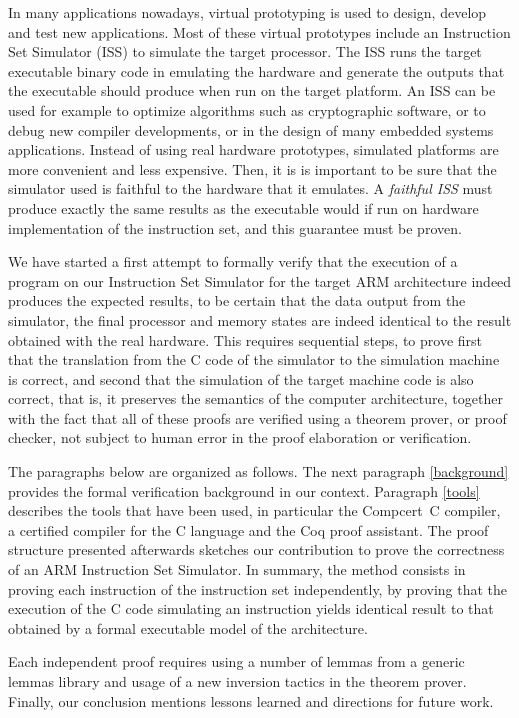 \documentclass{llncs}
\begin{document}
In many applications nowadays, virtual prototyping is used to design,
develop and test new applications. Most of these virtual prototypes
include an Instruction Set Simulator (ISS) to simulate the target
processor. The ISS runs the target executable binary code in emulating
the hardware and generate the outputs that the executable should
produce when run on the target platform. An ISS can be used for
example to optimize algorithms such as cryptographic software, or to
debug new compiler developments, or in the design of many embedded
systems applications.  Instead of using real hardware prototypes,
simulated platforms are more convenient and less expensive.  Then, it
is is important to be sure that the simulator used is faithful to the
hardware that it emulates.  A {\em faithful ISS} must produce exactly
the same results as the executable would if run on hardware
implementation of the instruction set, and this guarantee must be
proven.

We have started a first attempt to formally verify that the execution
of a program on our Instruction Set Simulator for the target ARM
architecture indeed produces the expected results, to be certain that
the data output from the simulator, the final processor and memory
states are indeed identical to the result obtained with the real
hardware. This requires sequential steps, to prove first that the
translation from the C code of the simulator to the simulation machine
is correct, and second that the simulation of the target machine code
is also correct, that is, it preserves the semantics of the computer
architecture, together with the fact that all of these proofs are
verified using a theorem prover, or proof checker, not subject to
human error in the proof elaboration or verification.

The paragraphs below are organized as follows. The next paragraph
\ref{background} provides the formal verification background in our
context.  Paragraph \ref{tools} describes the tools that have been
used, in particular the Compcert~C compiler, a certified compiler for
the C language and the Coq proof assistant.  The proof structure
presented afterwards sketches our contribution to prove the
correctness of an ARM Instruction Set Simulator. In summary, the
method consists in proving each instruction of the instruction set
independently, by proving that the execution of the C code simulating
an instruction yields identical result to that obtained by a formal
executable model of the architecture.

Each independent proof requires using a number of lemmas from a
generic lemmas library and usage of a new inversion tactics in the
theorem prover.  Finally, our conclusion mentions lessons learned and
directions for future work.
\end{document}
